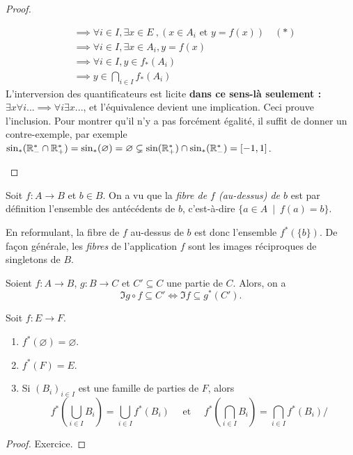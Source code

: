 \begin{proof}
\begin{enumerate}
\begin{align*}
&\boxed{\implies \forall i\in I, \exists x\in E}\:, (x\in A_i\text{ et } y=f(x)) \quad(*)\\
&\implies \forall i\in I, \exists x\in A_i, y=f(x)\\
&\implies \forall i\in I, y\in f_*(A_i)\\
&\implies y\in \bigcap_{i\in I} f_*(A_i)
\end{align*}
L'interversion des quantificateurs  est licite \textbf{dans ce sens-là seulement : $\exists x \forall i ... \implies \forall i \exists x ...$}, et l'équivalence devient une implication. Ceci prouve l'inclusion. Pour montrer qu'il n'y a pas forcément égalité, il suffit de donner un contre-exemple, par exemple $\sin_*(\mathbb{R}_-^* \cap \mathbb{R}_+^*) = \sin_*(\varnothing) = \varnothing \subsetneq \sin(\mathbb{R}_+^*) \cap \sin_*(\mathbb{R}_-^*)=[-1,1]$.
\end{enumerate}
\end{proof}



\begin{exemple}
Soit $f : A\to B$ et $b\in B$. On a vu que la \emph{fibre de $f$ (au-dessus) de $b$} est par définition l'ensemble des antécédents de $b$, c'est-à-dire $\{a\in A \:\mid\: f(a)=b\} $.

En reformulant, la fibre de $f$ au-dessus de $b$ est donc l'ensemble $f^*(\{b\})$. De façon générale, les \emph{fibres} de l'application $f$ sont les images réciproques de singletons de $B$.
\end{exemple}

\begin{exemple}
Soient $f : A\to B$,  $g : B\to C$ et $C'\subseteq C$ une partie de $C$. Alors, on a 
\[\Im g\circ f \subseteq C' \iff \Im f \subseteq g^*(C').\]
\end{exemple}

\begin{proposition}
Soit $f : E\to F$.
\begin{enumerate}
\item $f^*(\varnothing)=\varnothing$.
\item $f^*(F)=E$.
\item Si $(B_i)_{i\in I}$ est une famille de parties de $F$, alors 
\[
f^*\left(\bigcup_{i\in I}B_i\right) 
= \bigcup_{i\in I} f^*(B_i)
\quad \text{ et } \quad 
f^*\left(\bigcap_{i\in I}B_i\right) 
= \bigcap_{i\in I} f^*(B_i)/
\]
\end{enumerate}
\end{proposition}
\begin{proof} Exercice.
\end{proof}

